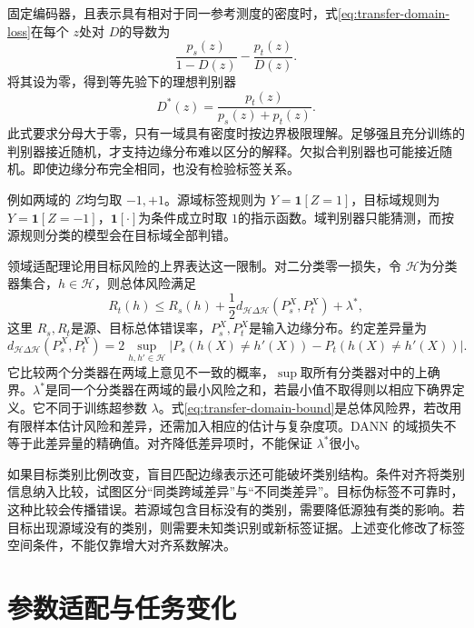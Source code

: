 固定编码器，且表示具有相对于同一参考测度的密度时，式\eqref{eq:transfer-domain-loss}在每个 $z$处对 $D$的导数为
\begin{equation}
 \frac{p_s(z)}{1-D(z)}-\frac{p_t(z)}{D(z)}.
\end{equation}
将其设为零，得到等先验下的理想判别器
\begin{equation}
 D^*(z)=\frac{p_t(z)}{p_s(z)+p_t(z)}.
\end{equation}
此式要求分母大于零，只有一域具有密度时按边界极限理解。足够强且充分训练的判别器接近随机，才支持边缘分布难以区分的解释。欠拟合判别器也可能接近随机。即使边缘分布完全相同，也没有检验标签关系。

例如两域的 $Z$均匀取 $-1,+1$。源域标签规则为 $Y=\mathbf1[Z=1]$，目标域规则为 $Y=\mathbf1[Z=-1]$，$\mathbf1[\cdot]$为条件成立时取 $1$的指示函数。域判别器只能猜测，而按源规则分类的模型会在目标域全部判错。

领域适配理论用目标风险的上界表达这一限制\cite{bendavid2010theory}。对二分类零一损失，令 $\mathcal H$为分类器集合，$h\in\mathcal H$，则总体风险满足
\begin{equation}
R_t(h)\le R_s(h)+\frac12d_{\mathcal H\Delta\mathcal H}(P_s^X,P_t^X)+\lambda^*,
\label{eq:transfer-domain-bound}
\end{equation}
这里 $R_s,R_t$是源、目标总体错误率，$P_s^X,P_t^X$是输入边缘分布。约定差异量为
\begin{equation}
 d_{\mathcal H\Delta\mathcal H}(P_s^X,P_t^X)
 =2\sup_{h,h'\in\mathcal H}
 \left|P_s(h(X)\ne h'(X))-P_t(h(X)\ne h'(X))\right|.
\end{equation}
它比较两个分类器在两域上意见不一致的概率，$\sup$取所有分类器对中的上确界。$\lambda^*$是同一个分类器在两域的最小风险之和，若最小值不取得则以相应下确界定义。它不同于训练超参数 $\lambda$。式\eqref{eq:transfer-domain-bound}是总体风险界，若改用有限样本估计风险和差异，还需加入相应的估计与复杂度项。DANN 的域损失不等于此差异量的精确值。对齐降低差异项时，不能保证 $\lambda^*$很小。

如果目标类别比例改变，盲目匹配边缘表示还可能破坏类别结构。条件对齐将类别信息纳入比较，试图区分“同类跨域差异”与“不同类差异”。目标伪标签不可靠时，这种比较会传播错误。若源域包含目标没有的类别，需要降低源独有类的影响。若目标出现源域没有的类别，则需要未知类识别或新标签证据。上述变化修改了标签空间条件，不能仅靠增大对齐系数解决。

\section{参数适配与任务变化}

